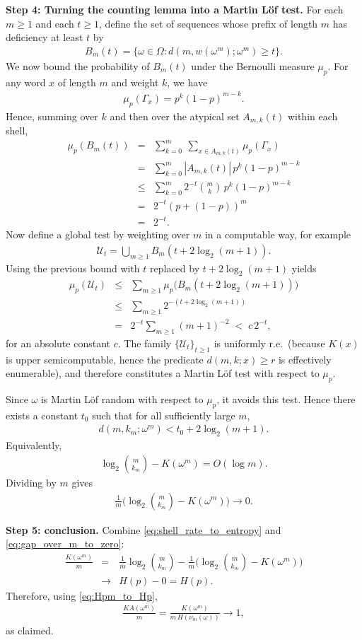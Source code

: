 \documentclass[12pt]{article}
\newcommand{\be}{\begin{eqnarray}}
\newcommand{\ee}{\end{eqnarray}}
\begin{document}
\medskip
\noindent
{\bf Step 4: Turning the counting lemma into a Martin L\"of test.}
For each $m\ge 1$ and each $t\ge 1$, define the set of sequences whose prefix of length $m$ has deficiency at least $t$ by
\be
B_{m}(t)=\{\omega\in\Omega: d(m,w(\omega^{m});\omega^{m})\ge t\}.
\label{eq:Bm_def}
\ee
We now bound the probability of $B_m(t)$ under the Bernoulli measure $\mu_p$.
For any word $x$ of length $m$ and weight $k$, we have
\be
\mu_p(\Gamma_{x})=p^{k}(1-p)^{m-k}.
\label{eq:bern_cylinder_prob}
\ee
Hence, summing over $k$ and then over the atypical set $A_{m,k}(t)$ within each shell,
\begin{eqnarray}
\mu_p(B_m(t))
&=&
\sum_{k=0}^{m}\ \sum_{x\in A_{m,k}(t)} \mu_p(\Gamma_x)
\nonumber\\
&=&
\sum_{k=0}^{m} |A_{m,k}(t)|\, p^{k}(1-p)^{m-k}
\nonumber\\
&\le&
\sum_{k=0}^{m} 2^{-t}\binom{m}{k}\, p^{k}(1-p)^{m-k}
\nonumber\\
&=&
2^{-t} (p + (1-p))^m
\nonumber\\
&=&
2^{-t}.
\end{eqnarray}
Now define a global test by weighting over $m$ in a computable way, for example
\be
\mathcal{U}_t=\bigcup_{m\ge 1} B_m(t+2\log_2(m+1)).
\label{eq:Ut_def}
\ee
Using the previous bound with $t$ replaced by $t+2\log_2(m+1)$ yields
\begin{eqnarray}
\mu_p(\mathcal{U}_t)
&\le&
\sum_{m\ge 1} \mu_p\Big(B_m(t+2\log_2(m+1))\Big)
\nonumber\\
&\le&
\sum_{m\ge 1} 2^{-(t+2\log_2(m+1))}
\nonumber\\
&=&
2^{-t}\sum_{m\ge 1}(m+1)^{-2}
\;<\;
c\,2^{-t},
\label{eq:Ut_prob_bound}
\end{eqnarray}
for an absolute constant $c$. The family $\{\mathcal{U}_t\}_{t\ge 1}$ is uniformly r.e.\ (because $K(x)$ is upper semicomputable, hence the predicate $d(m,k;x)\ge r$ is effectively enumerable), and therefore constitutes a Martin L\"of test with respect to $\mu_p$.

Since $\omega$ is Martin L\"of random with respect to $\mu_p$, it avoids this test.
Hence there exists a constant $t_0$ such that for all sufficiently large $m$,
\be
d(m,k_m;\omega^{m})
<
t_0 + 2\log_2(m+1).
\label{eq:deficiency_bound}
\ee
Equivalently,
\be
\log_2\binom{m}{k_m} - K(\omega^{m}) = O(\log m).
\label{eq:log_gap_Ologm}
\ee
Dividing by $m$ gives
\be
\frac{1}{m}\Big(\log_2\binom{m}{k_m}-K(\omega^{m})\Big)\to 0.
\label{eq:gap_over_m_to_zero}
\ee

\medskip
\noindent
{\bf Step 5: conclusion.}
Combine \eqref{eq:shell_rate_to_entropy} and \eqref{eq:gap_over_m_to_zero}:
\begin{eqnarray}
\frac{K(\omega^{m})}{m}
&=&
\frac{1}{m}\log_2\binom{m}{k_m}
-
\frac{1}{m}\Big(\log_2\binom{m}{k_m}-K(\omega^{m})\Big)
\nonumber\\
&\to&
H(p)-0
=
H(p).
\end{eqnarray}
Therefore, using \eqref{eq:Hpm_to_Hp},
\be
\frac{KA(\omega^{m})}{m}
=
\frac{K(\omega^{m})}{m\,H(\nu_m(\omega))}
\to
1,
\ee
as claimed.
\end{document}
